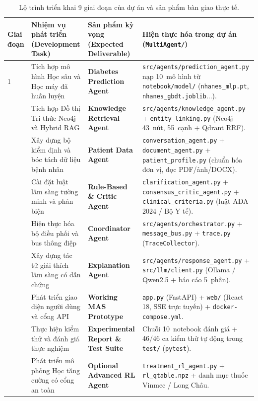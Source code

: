 \begin{table}[htbp]
\centering
\caption{Lộ trình triển khai 9 giai đoạn của dự án và sản phẩm bàn giao thực tế.}
\label{tab:roadmap}
\footnotesize
\renewcommand{\arraystretch}{1.1}
\begin{tabularx}{\linewidth}{@{}C{1.3cm}L{4.4cm}L{3.8cm}Y@{}}
\toprule
\textbf{Giai đoạn} & \textbf{Nhiệm vụ phát triển (Development Task)} & \textbf{Sản phẩm kỳ vọng (Expected Deliverable)} & \textbf{Hiện thực hóa trong dự án (\texttt{MultiAgent/})} \\
 & Tích hợp mô hình Học sâu và Học máy đã huấn luyện & \textbf{Diabetes Prediction Agent} & \texttt{src/agents/prediction\_agent.py} nạp 10~mô hình từ \texttt{notebook/model/} (\texttt{nhanes\_mlp.pt}, \texttt{nhanes\_gbdt.joblib}...). \\
 & Tích hợp Đồ thị Tri thức Neo4j và Hybrid RAG & \textbf{Knowledge Retrieval Agent} & \texttt{src/agents/knowledge\_agent.py} + \texttt{entity\_linking.py} (Neo4j 43~nút, 55~cạnh + Qdrant RRF). \\
 & Xây dựng bộ kiểm định và bóc tách dữ liệu bệnh nhân & \textbf{Patient Data Agent} & \texttt{conversation\_agent.py} + \texttt{document\_agent.py} + \texttt{patient\_profile.py} (chuẩn hóa đơn vị, đọc PDF/ảnh/DOCX). \\
 & Cài đặt luật lâm sàng tường minh và phản biện & \textbf{Rule-Based \& Critic Agent} & \texttt{clarification\_agent.py} + \texttt{consensus\_critic\_agent.py} + \texttt{clinical\_criteria.py} (luật ADA 2024 / Bộ Y tế). \\
 & Hiện thực hóa bộ điều phối và bus thông điệp & \textbf{Coordinator Agent} & \texttt{src/agents/orchestrator.py} + \texttt{message\_bus.py} + \texttt{trace.py} (\texttt{TraceCollector}). \\
 & Xây dựng tác tử giải thích lâm sàng có dẫn chứng & \textbf{Explanation Agent} & \texttt{src/agents/response\_agent.py} + \texttt{src/llm/client.py} (Ollama / Qwen2.5 + báo cáo 5~phần). \\
 & Phát triển giao diện người dùng và cổng API & \textbf{Working MAS Prototype} & \texttt{app.py} (FastAPI) + \texttt{web/} (React 18, SSE trực tuyến) + \texttt{docker-compose.yml}. \\
 & Thực hiện kiểm thử và đánh giá thực nghiệm & \textbf{Experimental Report \& Test Suite} & Chuỗi 10~notebook đánh giá + 46/46 ca kiểm thử tự động trong \texttt{test/} (\texttt{pytest}). \\
 & Phát triển mô phỏng Học tăng cường có cổng an toàn & \textbf{Optional Advanced RL Agent} & \texttt{treatment\_rl\_agent.py} + \texttt{rl\_qtable.npz} + danh mục thuốc Vinmec / Long Châu. \\
\bottomrule
\end{tabularx}
\end{table}

